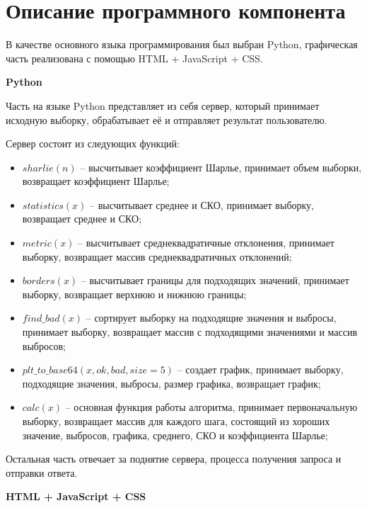 \documentclass[a4paper,14pt]{article}
\begin{document}
\section{Описание программного компонента}

В качестве основного языка программирования был выбран Python, графическая часть реализована с помощью HTML + JavaScript + CSS.

\textbf{Python}

Часть на языке Python представляет из себя сервер, который принимает исходную выборку, обрабатывает её и отправляет результат пользователю.

Сервер состоит из следующих функций:

\begin{itemize}
	\item $sharlie(n)$ -- высчитывает коэффициент Шарлье, принимает объем выборки, возвращает коэффициент Шарлье;
	
	\item $statistics(x)$ -- высчитывает среднее и СКО, принимает выборку, возвращает среднее и СКО;
	
	\item $metric(x)$ -- высчитывает среднеквадратичные отклонения, принимает выборку, возвращает массив среднеквадратичных отклонений;
	
	\item $borders(x)$ -- высчитывает границы для подходящих значений, принимает выборку, возвращает верхнюю и нижнюю границы;
	
	\item $find\_bad(x)$ -- сортирует выборку на подходящие значения и выбросы, принимает выборку, возвращает массив с подходящими значениями и массив выбросов;
	
	\item $plt\_to\_base64(x, ok, bad, size=5)$ -- создает график, принимает выборку, подходящие значения, выбросы, размер графика, возвращает график;
	
	\item $calc(x)$ -- основная функция работы алгоритма, принимает первоначальную выборку, возвращает массив для каждого шага, состоящий из хороших значение, выбросов, графика, среднего, СКО и коэффициента Шарлье;
	
\end{itemize}

	Остальная часть отвечает за поднятие сервера, процесса получения запроса и отправки ответа.
	
\textbf{HTML + JavaScript + CSS}
\end{document}
